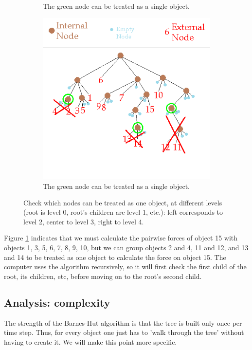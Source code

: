 \begin{figure}[H]
\begin{subfigure}{0.24\textwidth}
\caption{The green node can be treated as a single object.}
\end{subfigure}\hspace{1cm}
\begin{subfigure}{0.24\textwidth}
\includegraphics[width=\textwidth]{barneshut_tree_node_lvl4.png}
\caption{The green node can be treated as a single object.}
\end{subfigure}
\caption{Check which nodes can be treated as one object, at different levels (root is level 0, root's children are level 1, etc.): left corresponds to level 2, center to level 3, right to level 4.}\label{fig:check}
\end{figure}
Figure \ref{fig:check} indicates that we must calculate the pairwise forces of object 15 with objects 1, 3, 5, 6, 7, 8, 9, 10, but we can group objects 2 and 4, 11 and 12, and 13 and 14 to be treated as one object to calculate the force on object 15.
The computer uses the algorithm recursively, so it will first check the first child of the root, its children, etc, before moving on to the root's second child.

\subsection{Analysis: complexity}
The strength of the Barnes-Hut algorithm is that the tree is built only once per time step. Thus, for every object one just has to 'walk through the tree' without having to create it. We will make this point more specific.
